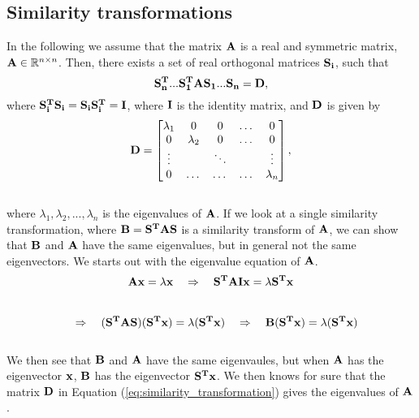 \documentclass[12pt]{article}
\begin{document}
\begin{flushleft}
\subsection{Similarity transformations}
In the following we assume that the matrix $\bf A$ is a real and symmetric matrix, ${\bf A}\in \mathbb{R}^{n\times n}$. Then, there exists a set of real orthogonal matrices $\bf S_i$, such that \\
\vspace{5mm}
\begin{equation}\label{eq:similarity_transformation}
{\bf S_n^T...S_1^T A S_1...S_n} = {\bf D},
\end{equation}
\vspace{5mm}
where ${\bf S_i^T S_i = S_i S_i^T = I}$, where ${\bf I}$ is the identity matrix, and $\bf D$ is given by\\
\vspace{5mm}
$${\bf D} = 
\begin{bmatrix}
       \lambda_1 & 0 & 0 & \dots & 0          \\
       0 & \lambda_2 & 0 & \dots & 0 \\
       \vdots &  & \ddots & & \vdots \\
       0 & \dots & \dots & \dots & \lambda_n
\end{bmatrix},$$\\ 
\vspace{5mm}
where $\lambda_1, \lambda_2,...,\lambda_n$ is the eigenvalues of $\bf A$. If we look at a single similarity transformation, where $\bf B = S^T A S$ is a similarity transform of $\bf A$, we can show that $\bf B$ and $\bf A$ have the same eigenvalues, but in general not the same eigenvectors. We starts out with the eigenvalue equation of $\bf A$.\\
\vspace{5mm}
$${\bf Ax } = \lambda\bf x \quad\Rightarrow\quad {\bf S^T A I x} = \lambda {\bf S^T x}$$\\
$$\quad\Rightarrow\quad {\bf (S^T A S) (S^T x)} = \lambda {\bf (S^T x)} \quad\Rightarrow\quad {\bf B (S^T x)} = \lambda {\bf (S^T x)}$$\\
\vspace{5mm}
We then see that $\bf B$ and $\bf A$ have the same eigenvaules, but when $\bf A$ has the eigenvector $\bf x$, $\bf B$ has the eigenvector $\bf S^T x$. We then knows for sure that the matrix $\bf D$ in Equation (\ref{eq:similarity_transformation}) gives the eigenvalues of $\bf A$.\\


\end{flushleft}
\end{document}
